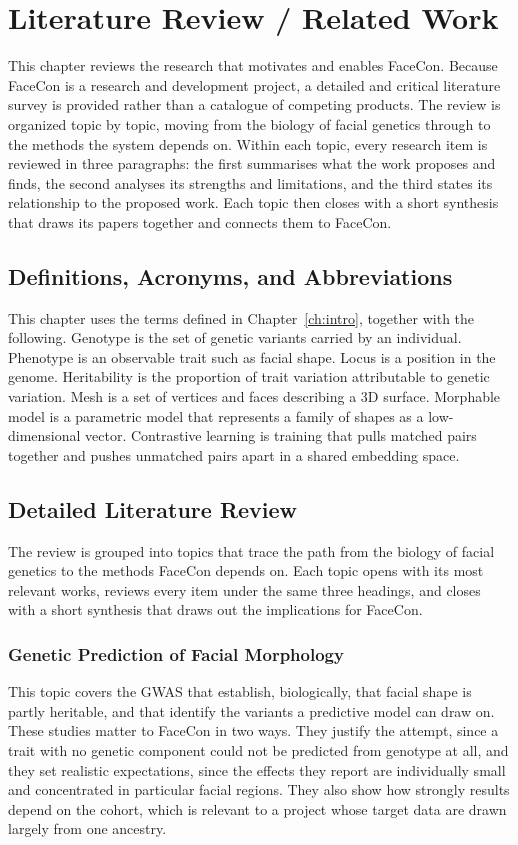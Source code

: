 \chapter{Literature Review / Related Work}
\label{ch:litreview}
This chapter reviews the research that motivates and enables FaceCon. Because FaceCon is a research and development project, a detailed and critical literature survey is provided rather than a catalogue of competing products. The review is organized topic by topic, moving from the biology of facial genetics through to the methods the system depends on. Within each topic, every research item is reviewed in three paragraphs: the first summarises what the work proposes and finds, the second analyses its strengths and limitations, and the third states its relationship to the proposed work. Each topic then closes with a short synthesis that draws its papers together and connects them to FaceCon.

\section{Definitions, Acronyms, and Abbreviations}
This chapter uses the terms defined in Chapter~\ref{ch:intro}, together with the following. Genotype is the set of genetic variants carried by an individual. Phenotype is an observable trait such as facial shape. Locus is a position in the genome. Heritability is the proportion of trait variation attributable to genetic variation. Mesh is a set of vertices and faces describing a 3D surface. Morphable model is a parametric model that represents a family of shapes as a low-dimensional vector. Contrastive learning is training that pulls matched pairs together and pushes unmatched pairs apart in a shared embedding space.

\section{Detailed Literature Review}
The review is grouped into topics that trace the path from the biology of facial genetics to the methods FaceCon depends on. Each topic opens with its most relevant works, reviews every item under the same three headings, and closes with a short synthesis that draws out the implications for FaceCon.

\subsection{Genetic Prediction of Facial Morphology}
This topic covers the GWAS that establish, biologically, that facial shape is partly heritable, and that identify the variants a predictive model can draw on. These studies matter to FaceCon in two ways. They justify the attempt, since a trait with no genetic component could not be predicted from genotype at all, and they set realistic expectations, since the effects they report are individually small and concentrated in particular facial regions. They also show how strongly results depend on the cohort, which is relevant to a project whose target data are drawn largely from one ancestry.

